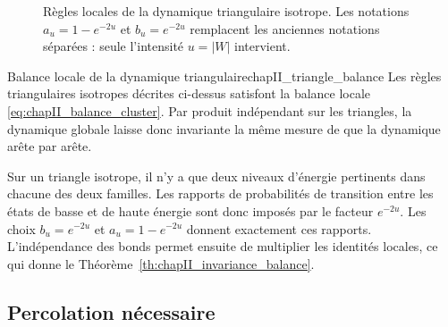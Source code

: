 \begin{figure}[H]
\centering
{}
\caption{Règles locales de la dynamique triangulaire isotrope. Les notations $a_u=1-e^{-2u}$ et $b_u=e^{-2u}$ remplacent les anciennes notations séparées : seule l'intensité $u=|W|$ intervient.}
\label{fig:chapII_triangle_rules}
\end{figure}

\begin{Fait}{Balance locale de la dynamique triangulaire}{chapII_triangle_balance}
Les règles triangulaires isotropes décrites ci-dessus satisfont la balance locale \eqref{eq:chapII_balance_cluster}. Par produit indépendant sur les triangles, la dynamique globale laisse donc invariante la même mesure de  que la dynamique arête par arête.
\end{Fait}

\begin{Preuve}
Sur un triangle isotrope, il n'y a que deux niveaux d'énergie pertinents dans chacune des deux familles. Les rapports de probabilités de transition entre les états de basse et de haute énergie sont donc imposés par le facteur $e^{-2u}$. Les choix $b_u=e^{-2u}$ et $a_u=1-e^{-2u}$ donnent exactement ces rapports. L'indépendance des bonds permet ensuite de multiplier les identités locales, ce qui donne le Théorème~\ref{th:chapII_invariance_balance}.
\end{Preuve}

\subsection{Percolation nécessaire}

